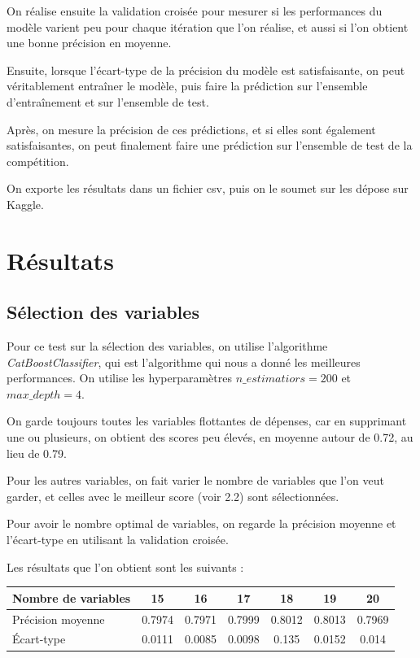 \documentclass[a4paper]{article}
\begin{document}
    On réalise ensuite la validation croisée pour mesurer si les performances du modèle varient peu pour chaque itération que l'on réalise,
    et aussi si l'on obtient une bonne précision en moyenne.

    Ensuite, lorsque l'écart-type de la précision du modèle est satisfaisante, on peut véritablement entraîner le modèle, puis
    faire la prédiction sur l'ensemble d'entraînement et sur l'ensemble de test.

    Après, on mesure la précision de ces prédictions, et si elles sont également satisfaisantes, on peut finalement 
    faire une prédiction sur l'ensemble de test de la compétition.

    On exporte les résultats dans un fichier csv, puis on le soumet sur les dépose sur Kaggle.

    \section{Résultats}

    \subsection{Sélection des variables}

    Pour ce test sur la sélection des variables, on utilise l'algorithme {\it CatBoostClassifier}, qui est l'algorithme qui nous a donné les meilleures performances. 
    On utilise les hyperparamètres $n\_estimatiors = 200$ et $max\_depth = 4$.

    On garde toujours toutes les variables flottantes de dépenses, car en supprimant une ou plusieurs, on obtient des scores peu élevés,
    en moyenne autour de 0.72, au lieu de 0.79.

    Pour les autres variables, on fait varier le nombre de variables que l'on veut garder, 
    et celles avec le meilleur score (voir 2.2) sont sélectionnées.

    Pour avoir le nombre optimal de variables, on regarde la précision moyenne et l'écart-type en utilisant la validation croisée.

    Les résultats que l'on obtient sont les suivants :

    \begin{tabular}{| l | *{6}{c|}}
        \hline
        Nombre de variables & 15 & 16 & 17 & 18 & 19 & 20
        \tabularnewline
        \hline
        Précision moyenne & 0.7974 & 0.7971 & 0.7999 & 0.8012 & 0.8013 & 0.7969
        \tabularnewline
        \hline
        Écart-type & 0.0111 & 0.0085 & 0.0098 & 0.135 & 0.0152 & 0.014
        \tabularnewline
        \hline
    \end{tabular}
\end{document}
